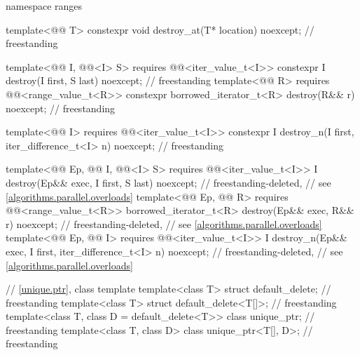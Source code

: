 \begin{codeblock}
{  namespace ranges {
    template<@@ T>
      constexpr void destroy_at(T* location) noexcept;                              // freestanding

    template<@@ I, @@<I> S>
      requires @@<iter_value_t<I>>
        constexpr I destroy(I first, S last) noexcept;                              // freestanding
    template<@@ R>
      requires @@<range_value_t<R>>
        constexpr borrowed_iterator_t<R> destroy(R&& r) noexcept;                   // freestanding

    template<@@ I>
      requires @@<iter_value_t<I>>
        constexpr I destroy_n(I first, iter_difference_t<I> n) noexcept;            // freestanding

    template<@@ Ep, @@ I,
             @@<I> S>
      requires @@<iter_value_t<I>>
        I destroy(Ep&& exec, I first, S last) noexcept;                     // freestanding-deleted,
                                                                            // see \ref{algorithms.parallel.overloads}
    template<@@ Ep, @@ R>
      requires @@<range_value_t<R>>
        borrowed_iterator_t<R> destroy(Ep&& exec, R&& r) noexcept;          // freestanding-deleted,
                                                                            // see \ref{algorithms.parallel.overloads}
    template<@@ Ep, @@ I>
      requires @@<iter_value_t<I>>
        I destroy_n(Ep&& exec, I first, iter_difference_t<I> n) noexcept;   // freestanding-deleted,
                                                                            // see \ref{algorithms.parallel.overloads}
  }

  // \ref{unique.ptr}, class template 
  template<class T> struct default_delete;                                          // freestanding
  template<class T> struct default_delete<T[]>;                                     // freestanding
  template<class T, class D = default_delete<T>> class unique_ptr;                  // freestanding
  template<class T, class D> class unique_ptr<T[], D>;                              // freestanding

}
\end{codeblock}
